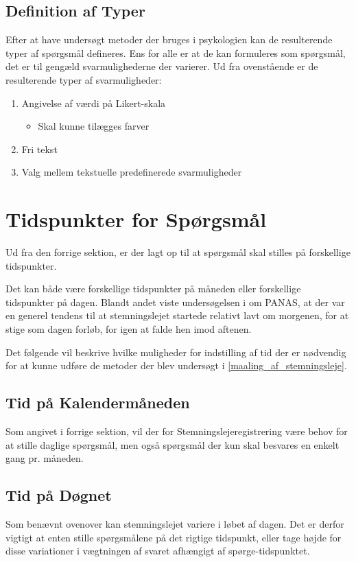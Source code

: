 \subsection{Definition af Typer}\label{krav::typer}
Efter at have undersøgt metoder der bruges i psykologien kan de resulterende typer af spørgsmål defineres.
Ens for alle er at de kan formuleres som spørgsmål, det er til gengæld svarmulighederne der varierer.
Ud fra ovenstående er de resulterende typer af svarmuligheder:

\begin{enumerate}
\item Angivelse af værdi på Likert-skala
\begin{itemize}
\item Skal kunne tilægges farver
\end{itemize}
\item Fri tekst
\item Valg mellem tekstuelle predefinerede svarmuligheder
\end{enumerate}

\section{Tidspunkter for Spørgsmål}
Ud fra den forrige sektion, er der lagt op til at spørgsmål skal stilles på forskellige tidspunkter.

Det kan både være forskellige tidspunkter på måneden eller forskellige tidspunkter på dagen.
Blandt andet viste undersøgelsen i \citet{panas} om PANAS, at der var en generel tendens til at stemningslejet startede relativt lavt om morgenen, for at stige som dagen forløb, for igen at falde hen imod aftenen.

Det følgende vil beskrive hvilke muligheder for indstilling af tid der er nødvendig for at kunne udføre de metoder der blev undersøgt i \cref{maaling_af_stemningsleje}.

\subsection{Tid på Kalendermåneden}
Som angivet i forrige sektion, vil der for Stemningslejeregistrering være behov for at stille daglige spørgsmål, men også spørgsmål der kun skal besvares en enkelt gang pr. måneden.

\subsection{Tid på Døgnet}
Som benævnt ovenover kan stemningslejet variere i løbet af dagen.
Det er derfor vigtigt at enten stille spørgsmålene på det rigtige tidspunkt, eller tage højde for disse variationer i vægtningen af svaret afhængigt af spørge-tidspunktet.

